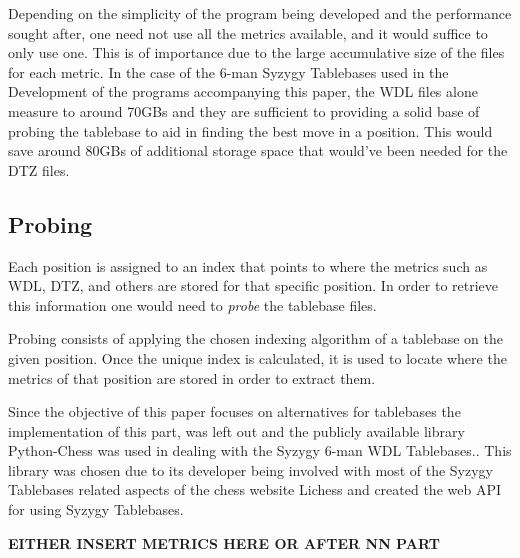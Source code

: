 Depending on the simplicity of the program being developed and the performance sought after, one need not use all the metrics available, and it would suffice to only use one. This is of importance due to the large accumulative size of the files for each metric. In the case of the 6-man Syzygy Tablebases used in the Development of the programs accompanying this paper, the WDL files alone measure to around 70GBs and they are sufficient to providing a solid base of probing the tablebase to aid in finding the best move in a position. This would save around 80GBs of additional storage space that would've been needed for the DTZ files.

\subsection{Probing}
Each position is assigned to an index that points to where the metrics such as WDL, DTZ, and others are stored for that specific position. In order to retrieve this information one would need to \textit{probe} the tablebase files.

Probing consists of applying the chosen indexing algorithm of a tablebase on the given position. Once the unique index is calculated, it is used to locate where the metrics of that position are stored in order to extract them.\cite{chesswikiEGTB}

Since the objective of this paper focuses on alternatives for tablebases the implementation of this part, was left out and the publicly available library Python-Chess\cite{pychess} was used in dealing with the Syzygy 6-man WDL Tablebases.. This library was chosen due to its developer being involved with most of the Syzygy Tablebases related aspects of the chess website Lichess and created the web API for using Syzygy Tablebases\cite{lichess}\cite{syzygyAPI}. 



\textbf{EITHER INSERT METRICS HERE OR AFTER NN PART}